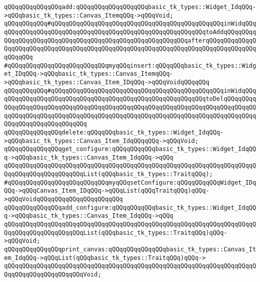 \verb|qQQqqQQqqQQqqQQqadd:qQQqqQQqqQQqqQQqqQQqbasic_tk_types::Widget_IdqQQq->qQQqbasic_tk_types::Canvas_ItemqQQq->qQQqVoid;|\newline
\verb|qQQqqQQqqQQq#qQQqqQQqqQQqqQQqqQQqqQQqqQQqqQQqqQQqqQQqqQQqqQQqinWidqQQqqQQqqQQqqQQqqQQqqQQqqQQqqQQqqQQqqQQqqQQqqQQqqQQqqQQqqQQqtoAddqQQqqQQqqQQqqQQqqQQqqQQqqQQqqQQqqQQqqQQqqQQqqQQqqQQqqQQqqQQqafterqQQqqQQqqQQqqQQqqQQqqQQqqQQqqQQqqQQqqQQqqQQqqQQqqQQqqQQqqQQqqQQqqQQqqQQqqQQqqQQqqQQqqQQqqQQq|\newline
\verb|#qQQqqQQqqQQqqQQqqQQqqQQqqQQqmyqQQqinsert:qQQqqQQqbasic_tk_types::Widget_IDqQQq->qQQqbasic_tk_types::Canvas_ItemqQQq->qQQqbasic_tk_types::Canvas_Item_IDqQQq->qQQqVoidqQQqqQQq|\newline
\verb|qQQqqQQqqQQq#qQQqqQQqqQQqqQQqqQQqqQQqqQQqqQQqqQQqqQQqqQQqqQQqinWidqQQqqQQqqQQqqQQqqQQqqQQqqQQqqQQqqQQqqQQqqQQqqQQqqQQqqQQqqQQqtoDelqQQqqQQqqQQqqQQqqQQqqQQqqQQqqQQqqQQqqQQqqQQqqQQqqQQqqQQqqQQqqQQqqQQqqQQqqQQqqQQqqQQqqQQqqQQqqQQqqQQqqQQqqQQqqQQqqQQqqQQqqQQqqQQqqQQqqQQqqQQqqQQqqQQqqQQqqQQqqQQqqQQqqQQqqQQq|\newline
\verb|qQQqqQQqqQQqqQQqdelete:qQQqqQQqbasic_tk_types::Widget_IdqQQq->qQQqbasic_tk_types::Canvas_Item_IdqQQqqQQq->qQQqVoid;|\newline
\newline
\newline
\verb|qQQqqQQqqQQqqQQqget_configure:qQQqqQQqqQQqbasic_tk_types::Widget_IdqQQq->qQQqbasic_tk_types::Canvas_Item_IdqQQq->qQQq|\newline
\verb|qQQqqQQqqQQqqQQqqQQqqQQqqQQqqQQqqQQqqQQqqQQqqQQqqQQqqQQqqQQqqQQqqQQqqQQqqQQqqQQqqQQqqQQqqQQqList(qQQqbasic_tk_types::TraitqQQq);|\newline
\verb|#qQQqqQQqqQQqqQQqqQQqqQQqqQQqmyqQQqsetConfigure:qQQqqQQqqQQqWidget_IDqQQq->qQQqCanvas_Item_IDqQQq->qQQqList(qQQqTraitqQQq)qQQq->qQQqVoidqQQqqQQqqQQqqQQqqQQqqQQq|\newline
\verb|qQQqqQQqqQQqqQQqadd_configure:qQQqqQQqqQQqbasic_tk_types::Widget_IdqQQq->qQQqbasic_tk_types::Canvas_Item_IdqQQq->qQQq|\newline
\verb|qQQqqQQqqQQqqQQqqQQqqQQqqQQqqQQqqQQqqQQqqQQqqQQqqQQqqQQqqQQqqQQqqQQqqQQqqQQqqQQqqQQqqQQqqQQqList(qQQqbasic_tk_types::TraitqQQq)qQQq->qQQqVoid;|\newline
\newline
\verb|qQQqqQQqqQQqqQQqprint_canvas:qQQqqQQqqQQqqQQqbasic_tk_types::Canvas_Item_IdqQQq->qQQqList(qQQqbasic_tk_types::TraitqQQq)qQQq->|\newline
\verb|qQQqqQQqqQQqqQQqqQQqqQQqqQQqqQQqqQQqqQQqqQQqqQQqqQQqqQQqqQQqqQQqqQQqqQQqqQQqqQQqqQQqqQQqqQQqVoid;|\newline
